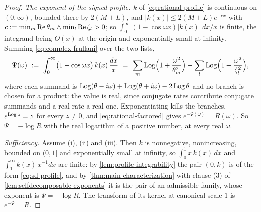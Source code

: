 \begin{proof}
\emph{The exponent of the signed profile.} $k$ of \ref{eq:rational-profile} is continuous on
$(0,\infty)$, bounded there by $2(M+L)$, and $|k(x)| \le 2(M+L)e^{-cx}$ with
$c := \min_m\operatorname{Re}\theta_m \wedge \min_l\operatorname{Re}\zeta_l > 0$; so $\int_0^\infty(1 - \cos\omega x)
|k(x)|\,dx/x$ is finite, the integrand being $O(x)$ at the origin and exponentially small at
infinity. Summing \ref{eq:complex-frullani} over the two lists,
\[
  \Psi(\omega) \ :=\ \int_0^\infty \bigl(1 - \cos\omega x\bigr)\,k(x)\,\frac{dx}{x}
   \ =\ \sum_{m}\operatorname{Log}\Bigl(1 + \frac{\omega^2}{\theta_m^2}\Bigr)
        - \sum_{l}\operatorname{Log}\Bigl(1 + \frac{\omega^2}{\zeta_l^2}\Bigr) ,
\]
where each summand is $\operatorname{Log}(\theta-i\omega) + \operatorname{Log}(\theta+i\omega) - 2\operatorname{Log}\theta$ and no branch is
chosen for a product: the value is real, since conjugate rates contribute conjugate summands and a
real rate a real one. Exponentiating kills the branches, $e^{\operatorname{Log} z} = z$ for every $z \ne 0$, and
\ref{eq:rational-factored} gives $e^{-\Psi(\omega)} = R(\omega)$. So $\Psi = -\log R$ with the
real logarithm of a positive number, at every real $\omega$.

\emph{Sufficiency.} Assume (i), (ii) and (iii). Then $k$ is nonnegative, nonincreasing, bounded on
$(0,1]$ and exponentially small at infinity, so $\int_0^1 x\,k(x)\,dx$ and
$\int_1^\infty k(x)\,x^{-1}dx$ are finite: by \ref{lem:profile-integrability} the pair $(0,k)$ is
of the form \ref{eq:sd-profile}, and by \ref{thm:main-characterization} with clause (3) of
\ref{lem:selfdecomposable-exponents} it is the pair of an admissible family, whose exponent is
$\Psi = -\log R$. The transform of its kernel at canonical scale $1$ is $e^{-\Psi} = R$.


\end{proof}
